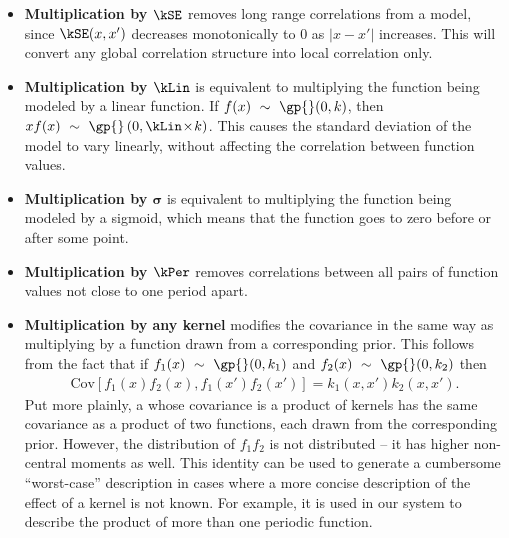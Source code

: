 \begin{itemize}
\item {\bf Multiplication by $\kSE$} removes long range correlations from a model, since $\kSE(x,x')$ decreases monotonically to 0 as $|x - x'|$ increases.
This will convert any global correlation structure into local correlation only.

\item {\bf Multiplication by $\kLin$} is equivalent to multiplying the function being modeled by a linear function.
If $f(x) \dist \gp{}(0, \kernel)$, then $xf(x) \dist \gp{}\left(0, \kLin \kerntimes k \right)$.
This causes the standard deviation of the model to vary linearly, without affecting the correlation between function values.

\item {\bf Multiplication by $\boldsymbol\sigma$} is equivalent to multiplying the function being modeled by a sigmoid, which means that the function goes to zero before or after some point.

\item {\bf Multiplication by $\kPer$}
removes correlations between all pairs of function values not close to one period apart.

\item {\bf Multiplication by any kernel}
modifies the covariance in the same way as multiplying by a function drawn from a corresponding \gp{} prior.
This follows from the fact that if ${f_1(x) \dist \gp{}(0, \kernel_1)}$ and ${f_2(x) \dist \gp{}(0, \kernel_2)}$ then
\begin{align}
{\textrm{Cov} \left[f_1(x)f_2(x), f_1(x')f_2(x') \right] = k_1(x,x')k_2(x,x')}.
\end{align}
Put more plainly, a \gp{} whose covariance is a product of kernels has the same covariance as a product of two functions, each drawn from the corresponding \gp{} prior.
However, the distribution of $f_1 f_2$ is not \gp{} distributed -- it has higher non-central moments as well.
This identity can be used to generate a cumbersome ``worst-case'' description in cases where a more concise description of the effect of a kernel is not known.
For example, it is used in our system to describe the product of more than one periodic function.
\end{itemize}

